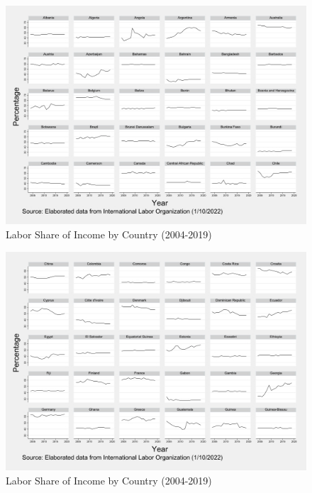 \documentclass[12pt, letterpaper]{article}
\numberwithin{table}{section}   %
\begin{document}
\begin{figure}[htp]
    \centering
    \includegraphics[width=14cm]{Countries30.jpg}
    \caption{Labor Share of Income by Country (2004-2019)}
    \label{fig:4-1}
\end{figure}
\begin{figure}[htp]
    \centering
    \includegraphics[width=14cm]{Countries60.jpg}
    \caption{Labor Share of Income by Country (2004-2019)}
    \label{fig:4-2}
\end{figure}
\end{document}

